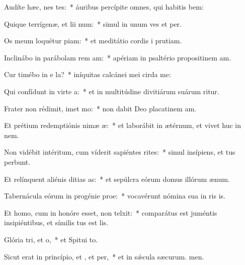 \item Audíte hæc, nes tes:~* áuribus percípite omnes, qui habitis bem:
\item Quique terrígenæ, et lii num:~* simul in unum ves et per.
\item Os meum loquétur piam:~* et meditátio cordis i prutiam.
\item Inclinábo in parábolam rem am:~* apériam in psaltério propositinem am.
\item Cur timébo in e la?~* iníquitas calcánei mei cirda me:
\item Qui confídunt in virte a:~* et in multitúdine divitiárum suárum ritur.
\item Frater non rédimit, imet mo:~* non dabit Deo placatinem am.
\item Et prétium redemptiónis nimæ æ:~* et laborábit in ætérnum, et vivet huc in nem.
\item Non vidébit intéritum, cum víderit sapiéntes rites:~* simul insípiens, et tus perbunt.
\item Et relínquent aliénis ditias as:~* et sepúlcra eórum domus illórum  ænum.
\item Tabernácula eórum in progénie  proe:~* vocavérunt nómina sua in ris is.
\item Et homo, cum in honóre esset, non telxit:~* comparátus est juméntis insipiéntibus, et símilis tus est lis.
\item Glória tri, et o,~* et Spitui to.
\item Sicut erat in princípio, et , et per,~* et in sǽcula sæcurum. men.
